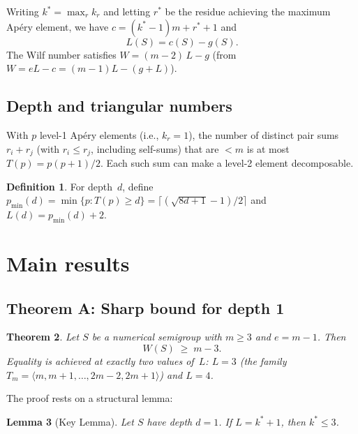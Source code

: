 \documentclass[11pt,a4paper]{amsart}
\newtheorem{theorem}{Theorem}[section]
\newtheorem{lemma}[theorem]{Lemma}
\theoremstyle{definition}
\newtheorem{definition}[theorem]{Definition}
\theoremstyle{remark}
\begin{document}
Writing $k^* = \max_r k_r$ and letting $r^*$ be the residue achieving
the maximum Ap\'ery element, we have $c = (k^*-1)m + r^* + 1$ and
\begin{equation}\label{eq:left}
  L(S) = c(S) - g(S).
\end{equation}
The Wilf number satisfies $W = (m-2)\,L - g$ (from $W = eL - c = (m-1)L - (g+L)$).

\subsection{Depth and triangular numbers}

With $p$ level-1 Ap\'ery elements (i.e., $k_r = 1$), the number of
distinct pair sums $r_i + r_j$ (with $r_i \le r_j$, including self-sums)
that are $< m$ is at most $T(p) = p(p+1)/2$.  Each such sum can make a
level-2 element decomposable.

\begin{definition}
For depth~$d$, define $p_{\min}(d) = \min\{p : T(p) \ge d\}
= \lceil(\sqrt{8d+1}-1)/2\rceil$ and $L(d) = p_{\min}(d) + 2$.
\end{definition}

\section{Main results}\label{sec:main}

\subsection{Theorem A: Sharp bound for depth 1}

\begin{theorem}\label{thm:A}
Let $S$ be a numerical semigroup with $m \ge 3$ and $e = m-1$.  Then
\[
  W(S) \;\ge\; m - 3.
\]
Equality is achieved at exactly two values of~$L$:
$L = 3$ (the family $T_m = \langle m, m{+}1, \dots, 2m{-}2, 2m{+}1\rangle$)
and $L = 4$.
\end{theorem}

The proof rests on a structural lemma:

\begin{lemma}[Key Lemma]\label{lem:key}
Let $S$ have depth $d = 1$.  If $L = k^* + 1$, then $k^* \le 3$.
\end{lemma}
\end{document}
